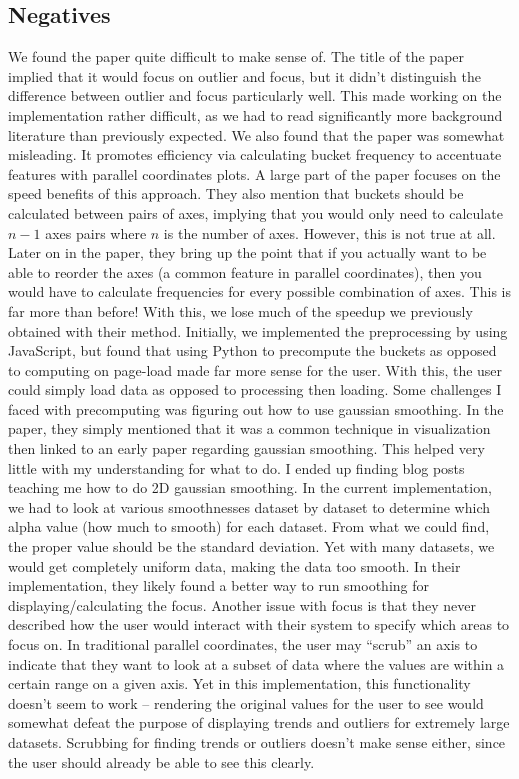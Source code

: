 \documentclass[	DIV=calc,%
			paper=a4,%
			fontsize=11pt,%
			twocolumn]{scrartcl}					%
\begin{document}
\subsection {Negatives}
We found the paper quite difficult to make sense of. The title of the paper implied that it would focus on outlier and focus, but it didn't distinguish the difference between outlier and focus particularly well. This made working on the implementation rather difficult, as we had to read significantly more background literature than previously expected. 
We also found that the paper was somewhat misleading. It promotes efficiency via calculating bucket frequency to accentuate features with parallel coordinates plots. A large part of the paper focuses on the speed benefits of this approach. They also mention that buckets should be calculated between pairs of axes, implying that you would only need to calculate $n-1$ axes pairs where $n$ is the number of axes. However, this is not true at all. Later on in the paper, they bring up the point that if you actually want to be able to reorder the axes (a common feature in parallel coordinates), then you would have to calculate frequencies for every possible combination of axes. This is far more than before! With this, we lose much of the speedup we previously obtained with their method. 
Initially, we implemented the preprocessing by using JavaScript, but found that using Python to precompute the buckets as opposed to computing on page-load made far more sense for the user. With this, the user could simply load data as opposed to processing then loading. 
Some challenges I faced with precomputing was figuring out how to use gaussian smoothing. In the paper, they simply mentioned that it was a common technique in visualization then linked to an early paper regarding gaussian smoothing. This helped very little with my understanding for what to do. I ended up finding blog posts teaching me how to do 2D gaussian smoothing. In the current implementation, we had to look at various smoothnesses dataset by dataset to determine which alpha value (how much to smooth) for each dataset. From what we could find, the proper value should be the standard deviation. Yet with many datasets, we would get completely uniform data, making the data too smooth. In their implementation, they likely found a better way to run smoothing for displaying/calculating the focus. 
Another issue with focus is that they never described how the user would interact with their system to specify which areas to focus on. In traditional parallel coordinates, the user may “scrub” an axis to indicate that they want to look at a subset of data where the values are within a certain range on a given axis. Yet in this implementation, this functionality doesn't seem to work -- rendering the original values for the user to see would somewhat defeat the purpose of displaying trends and outliers for extremely large datasets. Scrubbing for finding trends or outliers doesn't make sense either, since the user should already be able to see this clearly. 
\end{document}
